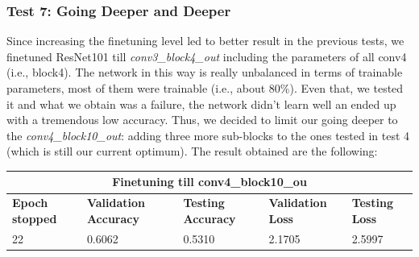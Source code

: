 \subsubsection{Test 7: Going Deeper and Deeper}
Since increasing the finetuning level led to better result in the previous tests, we finetuned ResNet101 till \textit{conv3\_block4\_out} including the parameters of all conv4 (i.e., block4). The network in this way is really unbalanced in terms of trainable parameters, most of them were trainable (i.e., about 80\%). Even that, we tested it and what we obtain was a failure, the network didn't learn well an ended up with a tremendous low accuracy. Thus, we decided to limit our going deeper to the \textit{conv4\_block10\_out}: adding three more sub-blocks to the ones tested in test 4 (which is still our current optimum).
\noindent The result obtained are the following:

\medskip

\begin{tabular}{ |p{2cm}|p{2cm}|p{2cm}|p{2cm}|p{2cm}|  }
\hline
\multicolumn{5}{|c|}{Finetuning till conv4\_block10\_ou} \\
\hline
\textbf{Epoch stopped} & \textbf{Validation Accuracy} & \textbf{Testing Accuracy} & \textbf{Validation Loss} & \textbf{Testing Loss} \\
\hline
22 & 0.6062 & 0.5310 & 2.1705 & 2.5997\\
\hline
\end{tabular}

